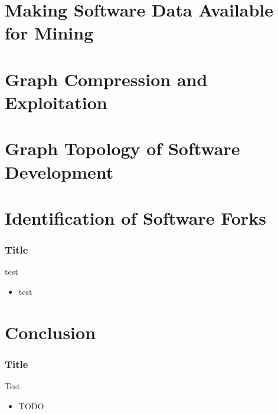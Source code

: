 \documentclass[aspectratio=169,xcolor=table]{beamer}
\begin{document}

    \section{Making Software Data Available for Mining}

    \section{Graph Compression and Exploitation}

    \section{Graph Topology of Software Development}

    \section{Identification of Software Forks}

    \begin{frame}
        \frametitle{Title}

        \begin{block}{test}
            \begin{itemize}
                \item test
            \end{itemize}
        \end{block}
    \end{frame}

    \section{Conclusion}

    \begin{frame}
        \frametitle{Title}

        \begin{block}{Test}
            \begin{itemize}
                \item TODO
            \end{itemize}
        \end{block}
    \end{frame}
\end{document}
